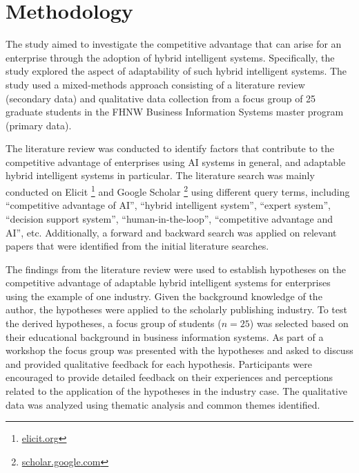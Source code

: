 \section{Methodology}
\label{sec:methods}

The study aimed to investigate the competitive advantage that can arise for an enterprise
through the adoption of hybrid intelligent systems. Specifically, the study explored the aspect of adaptability
of such hybrid intelligent systems. The study used a mixed-methods approach consisting of a literature
review (secondary data) and qualitative data collection from a focus group of 25 graduate students in the
FHNW Business Information Systems master program (primary data).

The literature review was conducted to identify factors that contribute to the competitive advantage
of enterprises using AI systems in general, and adaptable hybrid intelligent systems in particular.
The literature search was mainly conducted on Elicit \footnote{\href{https://elicit.org/}{elicit.org}}
and Google Scholar \footnote{\href{https://scholar.google.com/}{scholar.google.com}} using different
query terms, including ``competitive advantage of AI'', ``hybrid intelligent system'',
``expert system'', ``decision support system'', ``human-in-the-loop'', ``competitive advantage and AI'',
etc. Additionally, a forward and backward search was applied on relevant papers that were identified
from the initial literature searches.

The findings from the literature review were used to establish hypotheses on the competitive advantage
of adaptable hybrid intelligent systems for enterprises using the example of one industry. Given the
background knowledge of the author, the hypotheses were applied to the scholarly publishing industry.
To test the derived hypotheses, a focus group of students ($n = 25$) was selected based on their educational
background in business information systems. As part of a workshop the focus group was presented with the
hypotheses and asked to discuss and provided qualitative feedback for each hypothesis. Participants were
encouraged to provide detailed feedback on their experiences and perceptions related to the application
of the hypotheses in the industry case. The qualitative data was analyzed using thematic analysis and
common themes identified.
